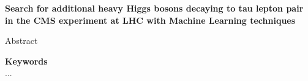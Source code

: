 \begin{center}
\LARGE
\bf
\sffamily
Search for additional heavy Higgs bosons decaying to tau lepton pair in the CMS experiment at LHC with Machine Learning techniques
\end{center}
\bigskip

Abstract

\vfill

\textbf{\Large Keywords}\\
...

\vfill
